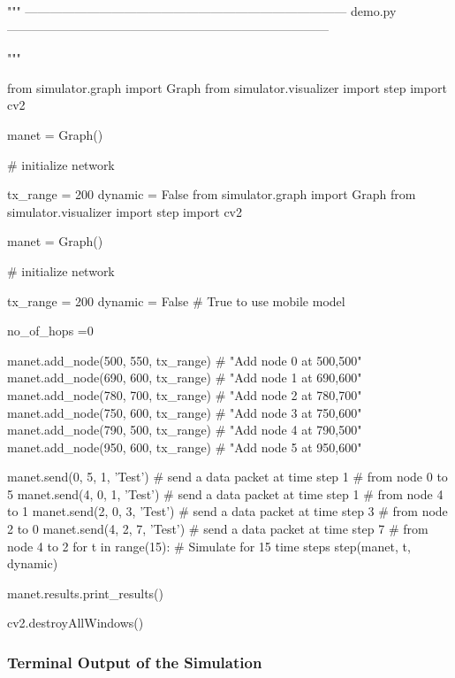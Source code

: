 \documentclass[a4paper,11pt]{article}%
\begin{document}
\begin{python}
	"""
	    ------------------------------------------------------------------------------
	    demo.py
	    ------------------------------------------------------------------------------

	"""

	from simulator.graph import Graph
	from simulator.visualizer import step
	import cv2

	manet = Graph()

	# initialize network

	tx_range = 200
	dynamic = False  from simulator.graph import Graph
	from simulator.visualizer import step
	import cv2

	manet = Graph()

	# initialize network


	tx_range = 200
	dynamic = False  # True to use mobile model

	no_of_hops =0

	manet.add_node(500, 550, tx_range)  # "Add node 0 at 500,500"
	manet.add_node(690, 600, tx_range)  # "Add node 1 at 690,600"
	manet.add_node(780, 700, tx_range)  # "Add node 2 at 780,700"
	manet.add_node(750, 600, tx_range)  # "Add node 3 at 750,600"
	manet.add_node(790, 500, tx_range)  # "Add node 4 at 790,500"
	manet.add_node(950, 600, tx_range)  # "Add node 5 at 950,600"

	manet.send(0, 5, 1, 'Test')  # send a data packet at time step 1
	                             # from node 0 to 5
	manet.send(4, 0, 1, 'Test')  # send a data packet at time step 1
	                             # from node 4 to 1
	manet.send(2, 0, 3, 'Test')  # send a data packet at time step 3
	                             # from node 2 to 0
	manet.send(4, 2, 7, 'Test')  # send a data packet at time step 7
	                             # from node 4 to 2
	for t in range(15):  # Simulate for 15 time steps
	    step(manet, t, dynamic)

	manet.results.print_results()

	cv2.destroyAllWindows()
\end{python}

\subsubsection{Terminal Output of the Simulation}
\end{document}

